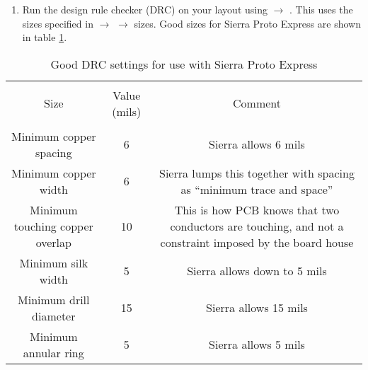 \begin{enumerate}

\item Run the design rule checker (DRC) on your layout using  $\rightarrow$      .  This uses the sizes specified in  $\rightarrow$  $\rightarrow$ sizes.  Good sizes for Sierra Proto Express are shown in table \ref{sierra_drc}.

\end{enumerate}

\begin{table}[htb]
\begin{center}
\begin{tabular}{|c|c|c|}\hline
&&\\
Size	&Value (mils)	&Comment\\
&&\\ \hline \hline

\parbox[c][1.5\height][c]{5cm}{Minimum copper spacing}
&6
&\parbox[c][1.5\height][c]{5cm}{Sierra allows 6 mils}\\ \hline

\parbox[c][1.5\height][c]{5cm}{Minimum copper width}
&6
&\parbox[c][1.5\height][c]{5cm}{Sierra lumps this together with spacing as ``minimum trace and space''}\\ \hline

\parbox[c][1.5\height][c]{5cm}{Minimum touching copper overlap}
&10
&\parbox[c][1.5\height][c]{5cm}{This is how PCB knows that two conductors are touching, and not a constraint imposed by the board house}\\ \hline

\parbox[c][1.5\height][c]{5cm}{Minimum silk width}
&5
&\parbox[c][1.5\height][c]{5cm}{Sierra allows down to 5 mils}\\ \hline

\parbox[c][1.5\height][c]{5cm}{Minimum drill diameter}
&15
&\parbox[c][1.5\height][c]{5cm}{Sierra allows 15 mils}\\ \hline

\parbox[c][1.5\height][c]{5cm}{Minimum annular ring}
&5
&\parbox[c][1.5\height][c]{5cm}{Sierra allows 5 mils}\\ \hline

\end{tabular}
\end{center}
\caption{Good DRC settings for use with Sierra Proto Express\label{sierra_drc}}
\end{table}
